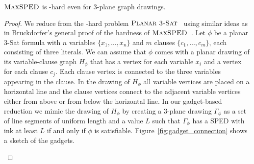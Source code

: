 \documentclass[a4paper,english,numberwithinsect]{eurocg18}
\newcommand{\maxsped}{\ensuremath{\textsc{MaxSPED}}\xspace}
\newcommand{\ppsat}{\ensuremath{\textsc{Planar 3-Sat}}\xspace}
\begin{document}
\begin{theorem}\label{thm:hard}
	\maxsped is \NP-hard even for 3-plane graph drawings.
\end{theorem}

\begin{proof}
	We reduce from the \NP-hard problem \ppsat~\cite{l-pftu-82} using similar ideas as in Bruckdorfer's general proof of the hardness of \maxsped~\cite{b-sgh-15}. %
	Let $\phi$ be a planar 3-Sat formula with $n$ variables $\{x_1, \dots, x_n\}$ and $m$ clauses $\{c_1, \dots, c_m\}$, each consisting of three literals.
	We can assume that $\phi$ comes with a planar drawing of its variable-clause graph $H_\phi$ that has a vertex for each variable $x_i$ and a vertex for each clause $c_j$.
	Each clause vertex is connected to the three variables appearing in the clause.
	In the drawing of $H_\phi$ all variable vertices are placed on a horizontal line and the clause vertices connect to the adjacent variable vertices either from above or from below the horizontal line.
	In our gadget-based reduction we mimic the drawing of $H_\phi$ by creating a 3-plane drawing $\Gamma_\phi$ as a set of line segments of uniform length and a value $L$ such that $\Gamma_\phi$ has a SPED with ink at least $L$ if and only if $\phi$ is satisfiable.
	Figure~\ref{fig:gadget_connection} shows a sketch of the gadgets.

		\begin{figure}


\end{figure}
\end{proof}
\end{document}
